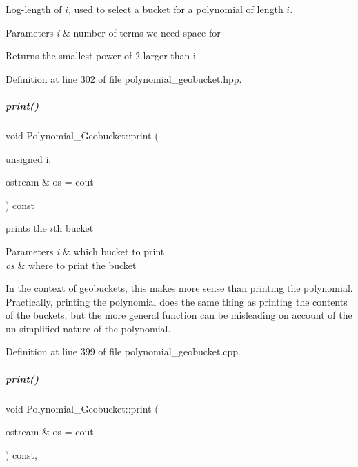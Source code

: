 Log-\/length of $i$, used to select a bucket for a polynomial of length $i$. 


\begin{DoxyParams}{Parameters}
{\em i} & number of terms we need space for \\
\hline
\end{DoxyParams}
\begin{DoxyReturn}{Returns}
the smallest power of 2 larger than i 
\end{DoxyReturn}


Definition at line 302 of file polynomial\+\_\+geobucket.\+hpp.

\mbox{\label{group__polygroup_a672dd35e16935aaa5d5334283eab918e}} 
\subparagraph{\texorpdfstring{print()}{print()}\hspace{0.1cm}{\footnotesize\ttfamily [1/2]}}
{\footnotesize\ttfamily void Polynomial\+\_\+\+Geobucket\+::print (\begin{DoxyParamCaption}\item[{unsigned}]{i,  }\item[{ostream \&}]{os = {\ttfamily cout} }\end{DoxyParamCaption}) const}



prints the $i$th bucket 


\begin{DoxyParams}{Parameters}
{\em i} & which bucket to print \\
\hline
{\em os} & where to print the bucket\\
\hline
\end{DoxyParams}
In the context of geobuckets, this makes more sense than printing the polynomial. Practically, printing the polynomial does the same thing as printing the contents of the buckets, but the more general function can be misleading on account of the un-\/simplified nature of the polynomial. 

Definition at line 399 of file polynomial\+\_\+geobucket.\+cpp.

\mbox{\label{group__polygroup_a3c8cb0c53e9acf4d60345fb4b4dbb807}} 
\subparagraph{\texorpdfstring{print()}{print()}\hspace{0.1cm}{\footnotesize\ttfamily [2/2]}}
{\footnotesize\ttfamily void Polynomial\+\_\+\+Geobucket\+::print (\begin{DoxyParamCaption}\item[{ostream \&}]{os = {\ttfamily cout} }\end{DoxyParamCaption}) const\hspace{0.3cm}{\ttfamily [override]}, {\ttfamily [virtual]}}



